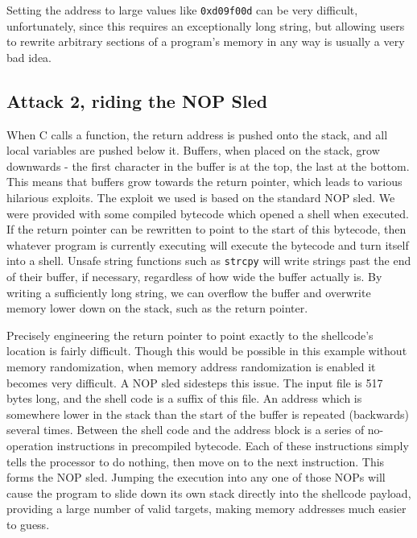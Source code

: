 
Setting the address to large values like {\tt 0xd09f00d} can be very difficult, unfortunately, since this requires an
exceptionally long string, but allowing users to rewrite arbitrary sections of a program's memory in any way is usually
a very bad idea.


\subsection{Attack 2, riding the NOP Sled}

When C calls a function, the return address is pushed onto the stack, and all local variables are pushed below it.
Buffers, when placed on the stack, grow downwards - the first character in the buffer is at the top, the last at the
bottom. This means that buffers grow towards the return pointer, which leads to various hilarious exploits. The exploit
we used is based on the standard NOP sled. We were provided with some compiled bytecode which opened a shell when
executed. If the return pointer can be rewritten to point to the start of this bytecode, then whatever program is
currently executing will execute the bytecode and turn itself into a shell. Unsafe string functions such as {\tt strcpy}
will write strings past the end of their buffer, if necessary, regardless of how wide the buffer actually is. By writing
a sufficiently long string, we can overflow the buffer and overwrite memory lower down on the stack, such as the return
pointer.

Precisely engineering the return pointer to point exactly to the shellcode's location is fairly difficult. Though this
would be possible in this example without memory randomization, when memory address randomization is enabled it becomes
very difficult. A NOP sled sidesteps this issue. The input file is 517 bytes long, and the shell code is a suffix of
this file. An address which is somewhere lower in the stack than the start of the buffer is repeated (backwards) several
times. Between the shell code and the address block is a series of no-operation instructions in precompiled bytecode.
Each of these instructions simply tells the processor to do nothing, then move on to the next instruction. This forms
the NOP sled. Jumping the execution into any one of those NOPs will cause the program to slide down its own stack
directly into the shellcode payload, providing a large number of valid targets, making memory addresses much easier to
guess.

